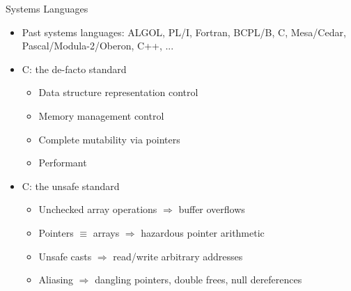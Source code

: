\documentclass[aspectratio=169]{beamer}
\begin{document}
\begin{frame}{Systems Languages}
\begin{itemize}[<+->]
    \item Past systems languages: \tiny{ALGOL, PL/I, Fortran, BCPL/B, C, Mesa/Cedar, Pascal/Modula-2/Oberon, C++, ...}
    \item C: the de-facto standard
        \begin{itemize}
            \item Data structure representation control
            \item Memory management control %
            \item Complete mutability via pointers %
            \item Performant
        \end{itemize}
    \item C: the unsafe standard
        \begin{itemize}
            \item Unchecked array operations $\Rightarrow$ buffer overflows
            \item Pointers $\equiv$ arrays $\Rightarrow$ hazardous pointer arithmetic
            \item Unsafe casts $\Rightarrow$ read/write arbitrary addresses
            \item Aliasing $\Rightarrow$ dangling pointers, double frees, null dereferences
        \end{itemize}
\end{itemize}
\end{frame}

\end{document}
